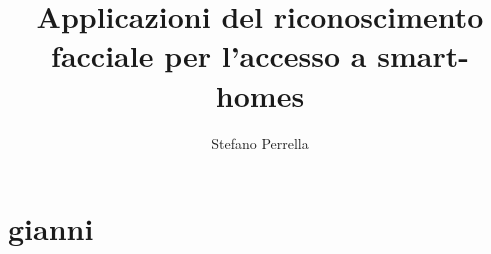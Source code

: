 \documentclass[Lau, italian]{sapthesis}
\title{Applicazioni del riconoscimento facciale per l'accesso a smart-homes}
\author{Stefano Perrella}
\begin{document}
\frontmatter
\maketitle


\tableofcontents

\mainmatter

\section{gianni}

\backmatter
\end{document}
